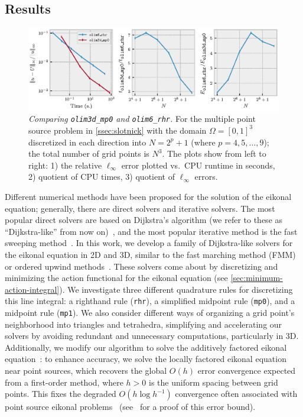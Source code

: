 \documentclass[eikonal.tex]{subfiles}
\begin{document}
\subsection{Results}

\begin{figure}
  \centering
  \includegraphics[width=\linewidth]{intro.eps}
  \vspace{-2em}
  \caption{\emph{Comparing \texttt{olim3d\_mp0} and
      \texttt{olim6\_rhr}.} For the multiple point source problem in
    \cref{ssec:slotnick} with the domain $\Omega = [0, 1]^3$
    discretized in each direction into $N = 2^p + 1$ (where
    $p = 4, 5, \hdots, 9$); the total number of grid points is
    $N^3$. The plots show from left to right: 1) the relative
    $\ell_\infty$ error plotted vs.\ CPU runtime in seconds, 2)
    quotient of CPU times, 3) quotient of $\ell_\infty$
    errors.}\label{fig:intro}
\end{figure}

Different numerical methods have been proposed for the solution of the
eikonal equation; generally, there are direct solvers and iterative
solvers. The most popular direct solvers are based on Dijkstra's
algorithm (we refer to these as ``Dijkstra-like'' from now
on)~\cite{tsitsiklis1995efficient,sethian1996fast}, and the most
popular iterative method is the fast sweeping
method~\cite{tsai2003fast,zhao2005fast}. In this work, we develop a
family of Dijkstra-like solvers for the eikonal equation in 2D and 3D,
similar to the fast marching method (FMM) or ordered upwind
methods~\cite{sethian1996fast,sethian2003ordered}. These solvers come
about by discretizing and minimizing the action functional for the
eikonal equation (see \cref{sec:minimum-action-integral}). We
investigate three different quadrature rules for discretizing this
line integral: a righthand rule (\texttt{rhr}), a simplified midpoint
rule (\texttt{mp0}), and a midpoint rule (\texttt{mp1}). We also
consider different ways of organizing a grid point's neighborhood into
triangles and tetrahedra, simplifying and accelerating our solvers by
avoiding redundant and unnecessary computations, particularly in
3D. Additionally, we modify our algorithm to solve the additively
factored eikonal equation~\cite{luo2012fast}: to enhance accuracy, we
solve the locally factored eikonal equation near point sources, which
recovers the global $O(h)$ error convergence expected from a
first-order method, where $h > 0$ is the uniform spacing between grid
points. This fixes the degraded $O(h \log h^{-1})$ convergence often
associated with point source eikonal problems~\cite{qi2018corner}
(see~\cite{zhao2005fast} for a proof of this error bound).
\end{document}
